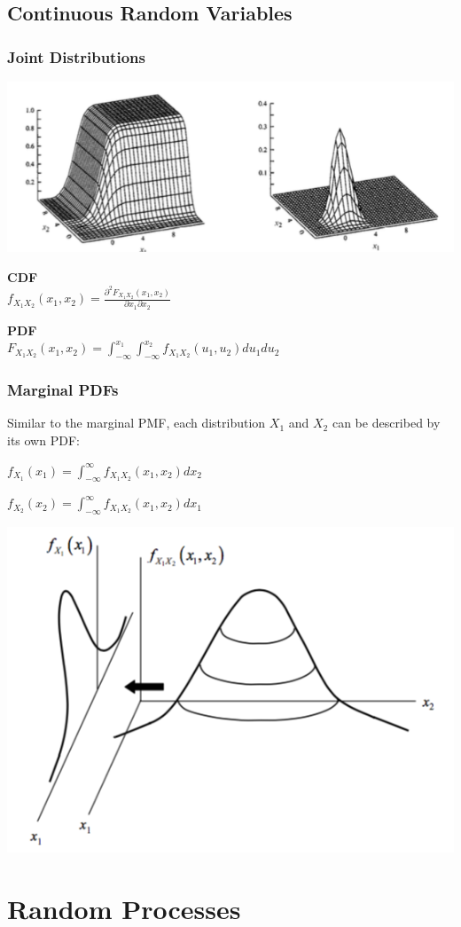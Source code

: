 \documentclass[11pt]{article}
\begin{document}
\subsection{Continuous Random Variables}

\subsubsection{Joint Distributions}

\begin{center}
    \includegraphics[width=300 px]{img/joint-cdf}  \\
\end{center}


\begin{center}
    \textbf{CDF} \\
    
    $f_{X_1X_2}(x_1,x_2) = \frac{\partial^2F_{X_1X_2}(x_1,x_2) }{\partial x_1 \partial x_2}$
\end{center}

\begin{center}
    \textbf{PDF} \\ 
    $F_{X_1X_2}(x_1,x_2) = \int_{-\infty}^{x_1} \int_{-\infty}^{x_2} f_{X_1X_2}(u_1,u_2)du_1du_2$
\end{center}

\subsubsection{Marginal PDFs}

Similar to the marginal PMF, each distribution $X_1$ and $X_2$ can be described by its own PDF:

\begin{center}
$f_{X_1}(x_1) = \int_{-\infty}^{\infty} f_{X_1X_2}(x_1,x_2)dx_2$ 
\end{center}
\begin{center}
    $f_{X_2}(x_2) = \int_{-\infty}^{\infty} f_{X_1X_2}(x_1,x_2)dx_1$ 
\end{center}
\begin{center}
    \includegraphics[width=300 px]{img/marginal-pdf}  \\
\end{center}


\pagebreak


\section{Random Processes}
\end{document}
